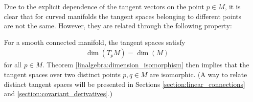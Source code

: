     Due to the explicit dependence of the tangent vectors on the point $p\in M$, it is clear that for curved manifolds the tangent spaces belonging to different points are not the same. However, they are related through the following property:
    \begin{property}
        For a smooth connected manifold, the tangent spaces satisfy
        \begin{gather}
            \dim(T_p M)=\dim(M)
        \end{gather}
        for all $p\in M$. Theorem \ref{linalgebra:dimension_isomorphism} then implies that the tangent spaces over two distinct points $p,q\in M$ are isomorphic. (A way to relate distinct tangent spaces will be presented in Sections \ref{section:linear_connections} and \ref{section:covariant_derivatives}.)
    \end{property}

